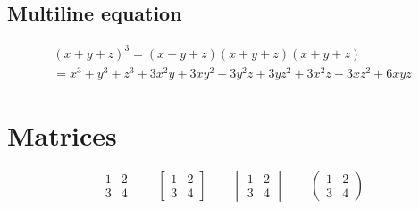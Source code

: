 \documentclass[12pt,a4paper]{article}
\begin{document}
\subsection{Multiline equation}

\begin{multline*}
(x+y+z)^3=(x+y+z)(x+y+z)(x+y+z)\\
=x^3+y^3+z^3+3x^2y+3xy^2+3y^2z+3yz^2+3x^2z+3xz^2+6xyz
\end{multline*}

\section{Matrices}

\[
\begin{matrix}
1&2\\
3&4
\end{matrix}
\qquad
\begin{bmatrix}
1&2\\
3&4
\end{bmatrix}
\qquad
\begin{vmatrix}
1&2\\
3&4
\end{vmatrix}
\qquad
\begin{pmatrix}
1&2\\
3&4
\end{pmatrix}
\]
\end{document}
